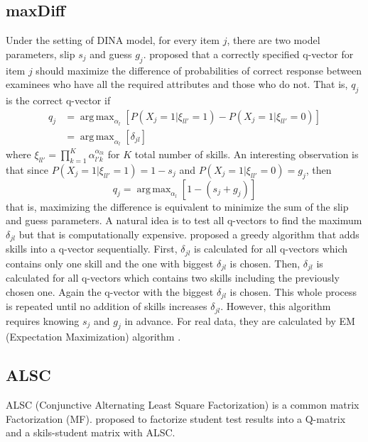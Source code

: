 \documentclass{edm_template}
\DeclareMathOperator*{\argmax}{arg\,max}
\begin{document}
\subsection{maxDiff}\label{sec:maxdiff}
Under the setting of DINA model, for every item $j$, there are two model parameters, slip $s_j$ and guess $g_j$.  proposed that a correctly specified q-vector for item $j$ should maximize the difference of probabilities of correct response between examinees who have all the required attributes and those who do not. That is, $q_j$ is the correct q-vector if
\begin{equation} 
\begin{split}
q_j & =\argmax_{\alpha _l}[P(X_j=1|\xi_{ll'}=1)-P(X_j=1|\xi_{ll'}=0)]
\\
& =\argmax_{\alpha _l}[\delta_{jl}]
\end{split}
\end{equation}
where $\xi_{ll'}=\prod_{k=1}^{K}\alpha_{l'k}^{\alpha_{lk}}$ for $K$ total number of skills. An interesting observation is that since $P(X_j=1|\xi_{ll'}=1)=1-s_j$ and $P(X_j=1|\xi_{ll'}=0)=g_j$, then $$q_j=\argmax_{\alpha _l}[1-(s_j+g_j)]$$ 
that is, maximizing the difference is equivalent to minimize the sum of the slip and guess parameters. A natural idea is to test all q-vectors to find the maximum $\delta_{jl}$ but that is computationally expensive.  proposed a greedy algorithm that adds skills into a q-vector sequentially. First, $\delta_{jl}$ is calculated for all q-vectors which contains only one skill and the one with biggest $\delta_{jl}$ is chosen. Then, $\delta_{jl}$ is calculated for all q-vectors which contains two skills including the previously chosen one. Again the q-vector with the biggest $\delta_{jl}$ is chosen. This whole process is repeated until no addition of skills increases $\delta_{jl}$. However, this algorithm requires knowing $s_j$ and $g_j$ in advance. For real data, they are calculated by EM (Expectation Maximization) algorithm \cite{de2009dina}.  

\subsection{ALSC}\label{sec:alsc}
ALSC (Conjunctive Alternating Least Square Factorization) is a common matrix Factorization (MF).  proposed to factorize student test results into a Q-matrix and a skils-student matrix with ALSC. 
\end{document}

